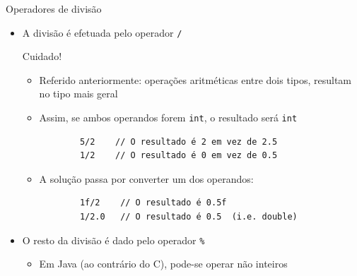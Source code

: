 \documentclass[portuguese, aspectratio=169, xcolor=table]{beamer}
\begin{document}
\begin{frame}[fragile]{Operadores de divisão}
\begin{itemize}
    \item A divisão é efetuada pelo operador \texttt{/}
    \begin{alertblock}{Cuidado!}
        \begin{itemize}
        \item Referido anteriormente: operações aritméticas entre dois tipos, resultam no tipo mais geral
        \item Assim, se ambos operandos forem \texttt{int}, o resultado será \texttt{int}
    \begin{verbatim}
        5/2    // O resultado é 2 em vez de 2.5
        1/2    // O resultado é 0 em vez de 0.5
    \end{verbatim}
    \item A solução passa por converter um dos operandos:
    \begin{verbatim}
        1f/2    // O resultado é 0.5f
        1/2.0   // O resultado é 0.5  (i.e. double)
    \end{verbatim}
    \end{itemize}
    \end{alertblock}
    \item O resto da divisão é dado pelo operador \texttt{\%}
    \begin{itemize}
        \item Em Java (ao contrário do C), pode-se operar não inteiros
    \end{itemize}
\end{itemize}
\end{frame}
\end{document}
